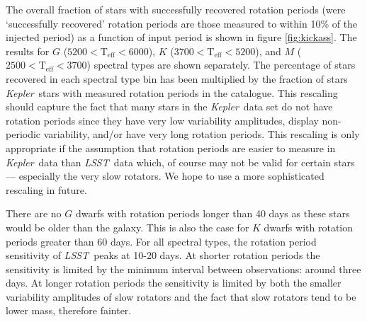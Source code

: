 \documentclass[useAMS, usenatbib, preprint, 12pt]{aastex}
\newcommand{\kepler}{{\it Kepler}}
\newcommand{\LSST}{{\it LSST}}
\begin{document}
The overall fraction of stars with successfully recovered rotation periods
(were `successfully recovered' rotation periods are those measured to within
10\% of the injected period) as a function of input period is shown in figure
\ref{fig:kickass}.
The results for $G$ ($5200<\mathrm{T}_{\mathrm{eff}}<6000$), $K$
($3700<\mathrm{T}_{\mathrm{eff}}<5200$), and $M$
($2500<\mathrm{T}_{\mathrm{eff}}<3700$) spectral types are shown separately.
The percentage of stars recovered in each spectral type bin has been
multiplied by the fraction of stars \kepler\ stars with measured rotation
periods in the \citet{Mcquillan2014} catalogue.
This rescaling should capture the fact that many stars in the \kepler\ data
set do not have rotation periods since they have very low variability
amplitudes, display non-periodic variability, and/or have very long rotation
periods.
This rescaling is only appropriate if the assumption that rotation periods are
easier to measure in \kepler\ data than \LSST\ data which, of course may not
be valid for certain stars --- especially the very slow rotators.
We hope to use a more sophisticated rescaling in future.

There are no $G$ dwarfs with rotation periods longer than 40 days as these
stars would be older than the galaxy.
This is also the case for $K$ dwarfs with rotation periods greater than 60
days.
For all spectral types, the rotation period sensitivity of \LSST\ peaks at
10-20 days.
At shorter rotation periods the sensitivity is limited by the minimum interval
between observations: around three days.
At longer rotation periods the sensitivity is limited by both the smaller
variability amplitudes of slow rotators and the fact that slow rotators tend
to be lower mass, therefore fainter.
\end{document}
